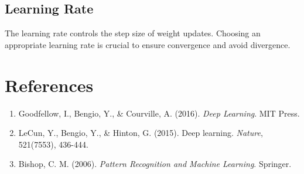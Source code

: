 \documentclass[a4paper,12pt]{article}
\begin{document}
\subsection{Learning Rate}
The learning rate controls the step size of weight updates. Choosing an appropriate learning rate is 
crucial to ensure convergence and avoid divergence.

\section{References}
\begin{enumerate}
  \item Goodfellow, I., Bengio, Y., \& Courville, A. (2016). \textit{Deep Learning}. MIT Press.
  \item LeCun, Y., Bengio, Y., \& Hinton, G. (2015). Deep learning. \textit{Nature}, 521(7553), 436-444.
  \item Bishop, C. M. (2006). \textit{Pattern Recognition and Machine Learning}. Springer.
\end{enumerate}
\end{document}
